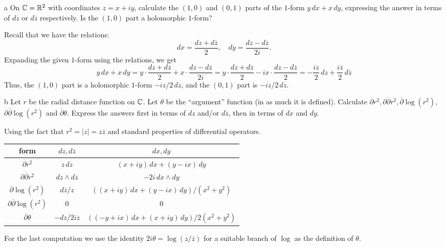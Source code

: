 \documentclass{lkx_pset}
\begin{document}
\begin{parts}
  \begin{part}{a}
    On $\mathbb{C} = \mathbb{R}^2$ with coordinates $z=x+iy$, calculate the $(1,0)$ and $(0,1)$ parts of the $1$-form $y\,dx + x\,dy$, expressing the answer in terms of $dz$ or $d\overline{z}$ respectively. Is the $(1,0)$ part a holomorphic $1$-form?
  \end{part}

  Recall that we have the relations:
  \[
    dx = \frac{dz+d\overline{z}}{2},\quad dy = \frac{dz - d\overline{z}}{2i}.
  \]
  Expanding the given $1$-form using the relations, we get
  \[
    y\,dx + x\,dy = y\cdot\frac{dz+d\overline{z}}{2} + x\cdot\frac{dz-d\overline{z}}{2i}
    =y\cdot \frac{dz+d\overline{z}}{2} - ix\cdot\frac{dz-d\overline{z}}{2} = -\frac{iz}{2}\,dz +\frac{i\overline{z}}{2}\,d\overline{z}
  \]
  Thus, the $(1,0)$ part is a holomorphic $1$-form $-iz/2\,dz$, and the $(0,1)$ part is $-iz/2\,dz$.

  \begin{part}{b}
    Let $r$ be the radial distance function on $\mathbb{C}$. Let $\theta$ be the ``argument'' function (in as much it is defined). Calculate $\overline{\partial} r^2, \partial\overline{\partial} r^2, \overline{\partial}\log(r^2)$, $\partial\overline{\partial} \log(r^2)$ and $\overline{\partial}\theta$. Express the answers first in terms of $dz$ and/or $d\overline{z}$, then in terms of $dx$ and $dy$.
  \end{part}

  Using the fact that $r^2 = |z|=z\overline{z}$ and standard properties of differential operators.
  \begin{center}
    \renewcommand*{\arraystretch}{1.2}
    \begin{tabular}{|c|c|c|} 
     \hline
     \textrm{form} & $dz,d\overline{z}$ & $dx,dy$ \\ 
     \hline
     $\overline{\partial} r^2$ & $z\,dz$ & $(x+iy)\,dx + (y-ix)\,dy$\\ 
     $\partial\overline{\partial} r^2$ & $dz\wedge d\overline{z}$ & $-2i\,dx\wedge dy$\\ 
     $\overline{\partial} \log(r^2)$ & $d\overline{z}/z$ & $((x+iy)\,dx + (y-ix)\,dy)/(x^2+y^2)$\\ 
     $\partial \overline{\partial} \log(r^2)$ & $0$ & $0$\\ 
     $\overline{\partial} \theta$ & $-d\overline{z}/2i\overline{z}$ & $((-y+ix)\,dx+(x+iy)\,dy)/2(x^2+y^2)$\\ 
     \hline
    \end{tabular}
  \end{center}
  For the last computation we use the identity $2i\theta = \log(z/\overline{z})$ for a suitable branch of $\log$ as the definition of $\theta$.

\end{parts}
\end{document}
